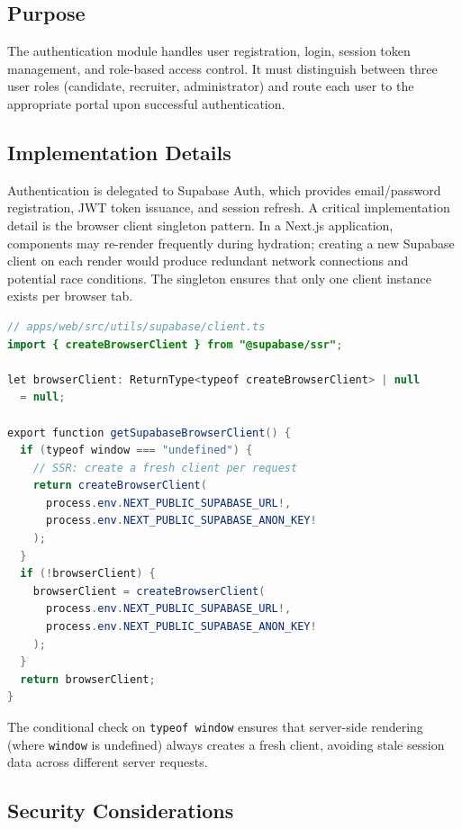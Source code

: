 \subsection{Purpose}

The authentication module handles user registration, login, session token management, and role-based access control. It must distinguish between three user roles (candidate, recruiter, administrator) and route each user to the appropriate portal upon successful authentication.

\subsection{Implementation Details}

Authentication is delegated to Supabase Auth, which provides email/password registration, JWT token issuance, and session refresh. A critical implementation detail is the browser client singleton pattern. In a Next.js application, components may re-render frequently during hydration; creating a new Supabase client on each render would produce redundant network connections and potential race conditions. The singleton ensures that only one client instance exists per browser tab.

\begin{lstlisting}[language=Java, caption={Supabase browser client singleton}]
// apps/web/src/utils/supabase/client.ts
import { createBrowserClient } from "@supabase/ssr";

let browserClient: ReturnType<typeof createBrowserClient> | null
  = null;

export function getSupabaseBrowserClient() {
  if (typeof window === "undefined") {
    // SSR: create a fresh client per request
    return createBrowserClient(
      process.env.NEXT_PUBLIC_SUPABASE_URL!,
      process.env.NEXT_PUBLIC_SUPABASE_ANON_KEY!
    );
  }
  if (!browserClient) {
    browserClient = createBrowserClient(
      process.env.NEXT_PUBLIC_SUPABASE_URL!,
      process.env.NEXT_PUBLIC_SUPABASE_ANON_KEY!
    );
  }
  return browserClient;
}
\end{lstlisting}

The conditional check on \texttt{typeof window} ensures that server-side rendering (where \texttt{window} is undefined) always creates a fresh client, avoiding stale session data across different server requests.

\subsection{Security Considerations}

